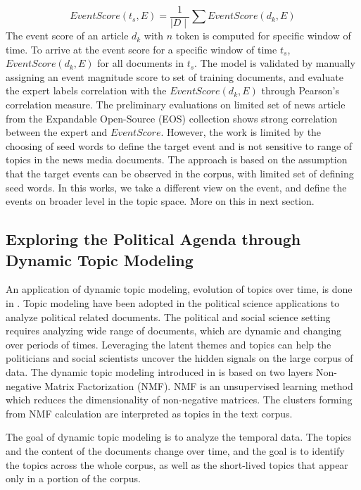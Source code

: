 \begin{equation}\label{eq:EventScore}
EventScore (t_s, E) =  \frac{1}{\mid D\mid}    \sum EventScore(d_k, E)
\end{equation}
The event score of an article $d_k$ with $n$ token is computed for specific window of time. To arrive at the event score for a specific window of time $t_s$, $EventScore(d_k, E)$ for all documents in $t_s$. The model is validated by manually assigning an event magnitude score to set of training documents, and evaluate the expert labels correlation with the $EventScore (d_k, E)$ through Pearson's correlation measure. The preliminary evaluations on limited set of news article from the Expandable Open-Source (EOS) collection shows strong correlation between the expert and $EventScore.$ However, the work is limited by the choosing of seed words to define the target event and is not sensitive to range of topics in the news media documents. The approach is based on the assumption that the target events can be observed in the corpus, with limited set of defining seed words. In this works, we take a different view on the event, and define the events on broader level in the topic space. More on this in next section. 

\subsection{Exploring the Political Agenda through Dynamic Topic Modeling}
An application of dynamic topic modeling, evolution of topics over time, is done in \cite{Greene2016}. Topic modeling have been adopted in the political science applications to analyze political related documents. The political and social science setting requires analyzing wide range of documents, which are dynamic and changing over periods of times. Leveraging the latent themes and topics can help the politicians and social scientists uncover the hidden signals on the large corpus of data. The dynamic topic modeling introduced in \cite{Greene2016} is based on two layers Non-negative Matrix Factorization (NMF). NMF is an unsupervised learning method which reduces the dimensionality of non-negative matrices. The clusters forming from NMF calculation are interpreted as topics in the text corpus. 

The goal of dynamic topic modeling is to analyze the temporal data. The topics and the content of the documents change over time, and the goal is to identify the topics across the whole corpus, as well as the short-lived topics that appear only in a portion of the corpus. 

